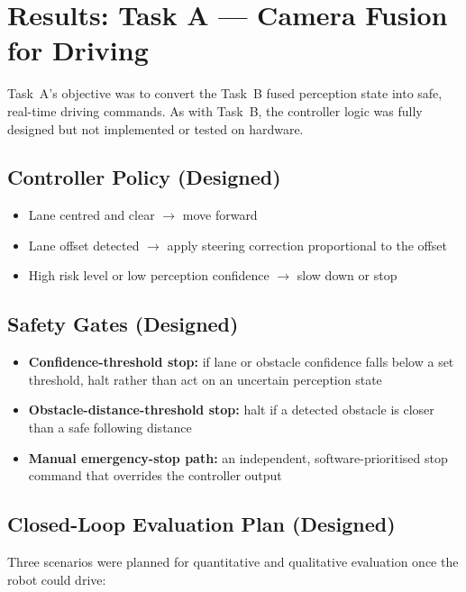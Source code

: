 \documentclass{imc-inf}
\begin{document}
\chapter{Results: Task A --- Camera Fusion for Driving}
\label{chap:task-a}

Task~A's objective was to convert the Task~B fused perception state into safe,
real-time driving commands. As with Task~B, the controller logic was fully designed
but not implemented or tested on hardware.

\section{Controller Policy (Designed)}
\label{sec:controller-policy}

\begin{itemize}
\item Lane centred and clear $\rightarrow$ move forward
\item Lane offset detected $\rightarrow$ apply steering correction proportional
to the offset
\item High risk level or low perception confidence $\rightarrow$ slow down or stop
\end{itemize}

\section{Safety Gates (Designed)}
\label{sec:safety-gates}

\begin{itemize}
\item \textbf{Confidence-threshold stop:} if lane or obstacle confidence falls
below a set threshold, halt rather than act on an uncertain perception state
\item \textbf{Obstacle-distance-threshold stop:} halt if a detected obstacle is
closer than a safe following distance
\item \textbf{Manual emergency-stop path:} an independent, software-prioritised
stop command that overrides the controller output
\end{itemize}

\section{Closed-Loop Evaluation Plan (Designed)}
\label{sec:evaluation-plan}

Three scenarios were planned for quantitative and qualitative evaluation once the
robot could drive:
\end{document}
